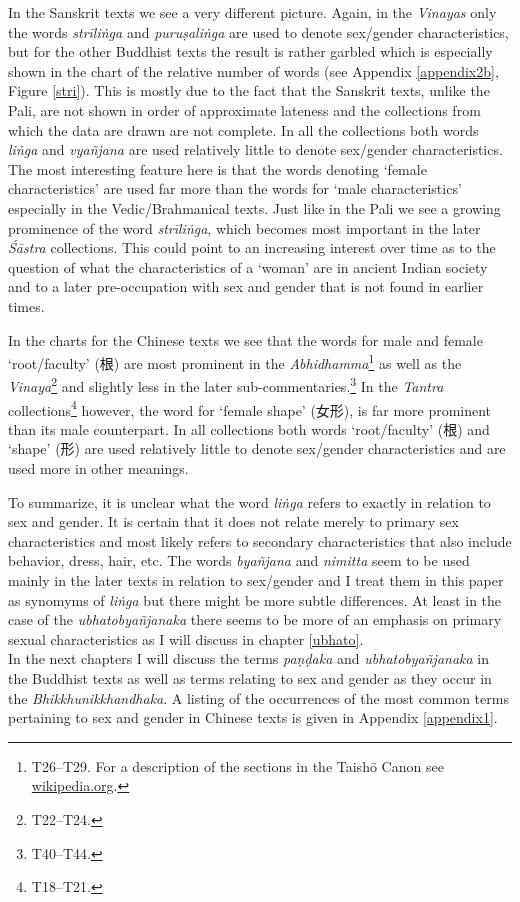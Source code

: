 In the Sanskrit texts we see a very different picture. Again, in the \textit{Vinayas} only the words \textit{strīliṅga} and \textit{puruṣaliṅga} are used to denote sex/gender characteristics, but for the other Buddhist texts the result is rather garbled which is especially shown in the chart of the relative number of words (see Appendix \ref{appendix2b}, Figure \ref{stri}). This is mostly due to the fact that the Sanskrit texts, unlike the Pali, are not shown in order of approximate lateness and the collections from which the data are drawn are not complete. In all the collections both words \textit{liṅga} and \textit{vyañjana} are used relatively little to denote sex/gender characteristics. The most interesting feature here is that the words denoting `female characteristics' are used far more than the words for `male characteristics' especially in the Vedic/Brahmanical texts. Just like in the Pali we see a growing prominence of the word \textit{strīliṅga}, which becomes most important in the later \textit{Śāstra} collections. This could point to an increasing interest over time as to the question of what the characteristics of a `woman' are in ancient Indian society and to a later pre-occupation with sex and gender that is not found in earlier times.

In the charts for the Chinese texts we see that the words for male and female `root/faculty' (根) are most prominent in the \textit{Abhidhamma}\footnote{T26–T29. For a description of the sections in the Taishō Canon see \href{https://en.wikipedia.org/wiki/Taishō_Tripiṭaka}{wikipedia.org}.} as well as the \textit{Vinaya}\footnote{T22–T24.} and slightly less in the later sub-commentaries.\footnote{T40–T44.} In the \textit{Tantra} collections\footnote{T18–T21.} however, the word for `female shape' (女形), is far more prominent than its male counterpart. In all collections both words `root/faculty' (根) and `shape' (形) are used relatively little to denote sex/gender characteristics and are used more in other meanings.

To summarize, it is unclear what the word \textit{liṅga} refers to exactly in relation to sex and gender. It is certain that it does not relate merely to primary sex characteristics and most likely refers to secondary characteristics that also include behavior, dress, hair, etc. The words \textit{byañjana} and \textit{nimitta} seem to be used mainly in the later texts in relation to sex/gender and I treat them in this paper as synomyms of \textit{liṅga} but there might be more subtle differences. At least in the case of the \textit{ubhatob­yañ­janaka} there seems to be more of an emphasis on primary sexual characteristics as I will discuss in chapter \ref{ubhato}.\\

In the next chapters I will discuss the terms \textit{paṇḍaka} and \textit{ubhatob­yañ­janaka} in the Buddhist texts as well as terms relating to sex and gender as they occur in the \textit{Bhikkhunikkhandhaka}. A listing of the occurrences of the most common terms pertaining to sex and gender in Chinese texts is given in Appendix \ref{appendix1}. 
